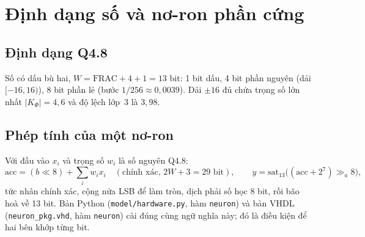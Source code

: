 \documentclass[11pt,a4paper]{article}
\newcommand{\code}[1]{\texttt{#1}}
\begin{document}
\section{Định dạng số và nơ-ron phần cứng}

\subsection{Định dạng Q4.8}
Số có dấu bù hai, $W=\mathrm{FRAC}+4+1=13$ bit: 1 bit dấu, 4 bit phần nguyên (dải $[-16,16)$), 8 bit
phần lẻ (bước $1/256\approx0{,}0039$). Dải $\pm16$ đủ chứa trọng số lớn nhất $|K_\Phi|=4{,}6$ và độ lệch
lớp~3 là $3{,}98$.

\subsection{Phép tính của một nơ-ron}
Với đầu vào $x_i$ và trọng số $w_i$ là số nguyên Q4.8:
\[
\mathrm{acc}=(b\ll8)+\sum_i w_i x_i\quad(\text{chính xác, }2W+3=29\text{ bit}),\qquad
y=\mathrm{sat}_{13}\bigl((\mathrm{acc}+2^{7})\gg_a 8\bigr),
\]
tức nhân chính xác, cộng nửa LSB để làm tròn, dịch phải số học 8 bit, rồi bão hoà về 13 bit. Bản Python
(\code{model/hardware.py}, hàm \code{neuron}) và bản VHDL (\code{neuron\_pkg.vhd}, hàm \code{neuron}) cài
đúng cùng ngữ nghĩa này; đó là điều kiện để hai bên khớp từng bit.
\end{document}
